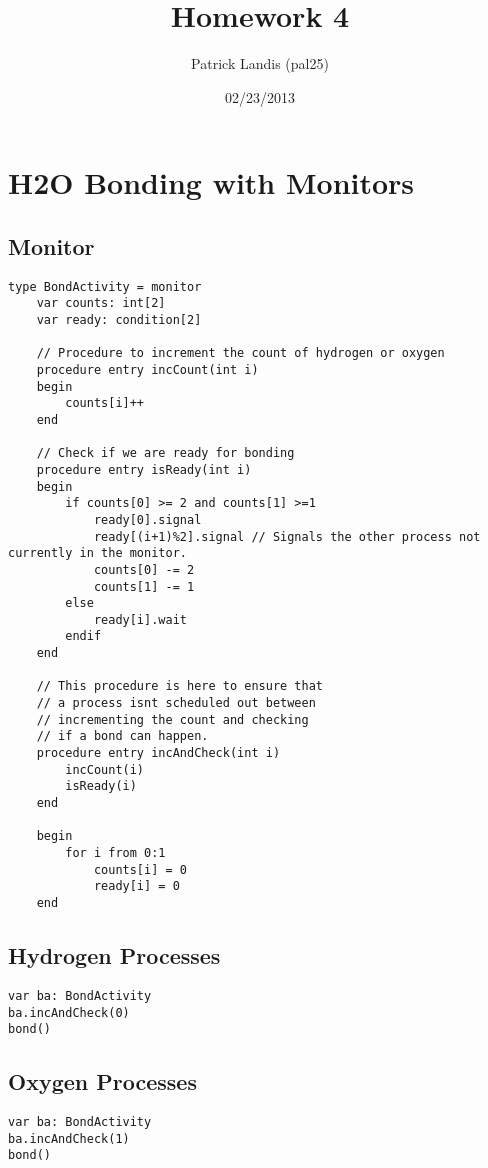 \documentclass[]{article}
\title{Homework 4}
\author{Patrick Landis (pal25)}
\date{02/23/2013}
\begin{document}
\maketitle

\section{H2O Bonding with Monitors}
\subsection{Monitor}
\begin{verbatim}
type BondActivity = monitor
    var counts: int[2]
    var ready: condition[2]

    // Procedure to increment the count of hydrogen or oxygen
    procedure entry incCount(int i)
    begin
        counts[i]++
    end
    
    // Check if we are ready for bonding
    procedure entry isReady(int i)
    begin
        if counts[0] >= 2 and counts[1] >=1
            ready[0].signal
   	        ready[(i+1)%2].signal // Signals the other process not currently in the monitor.
   	        counts[0] -= 2
   	        counts[1] -= 1
        else
            ready[i].wait
        endif
    end
	
    // This procedure is here to ensure that
    // a process isnt scheduled out between
    // incrementing the count and checking
    // if a bond can happen.
    procedure entry incAndCheck(int i)
        incCount(i)
        isReady(i)
    end
	
    begin
        for i from 0:1
            counts[i] = 0
            ready[i] = 0
    end 
\end{verbatim}

\begin{multicols}{2}
\subsection{Hydrogen Processes}
\begin{verbatim}
var ba: BondActivity
ba.incAndCheck(0)
bond()
\end{verbatim}

\subsection{Oxygen Processes}
\begin{verbatim}
var ba: BondActivity
ba.incAndCheck(1)
bond()
\end{verbatim}
\end{multicols}
\end{document}
